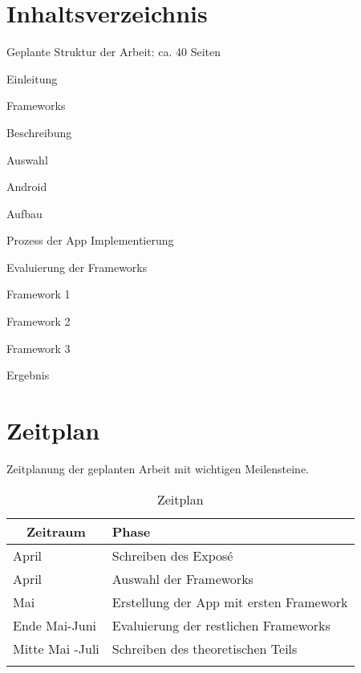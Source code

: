 \documentclass[a4paper,10pt,german,public]{INSOexpose}
\begin{document}
\section{Inhaltsverzeichnis}
Geplante Struktur der Arbeit: ca. 40 Seiten	
\begin{samepage}
  \begin{contentstructure}
    \item Einleitung	
    \item Frameworks 
    \begin{contentstructure}
      \item Beschreibung 
      \item Auswahl 
    \end{contentstructure}
    \item Android 
    \begin{contentstructure}
      \item Aufbau 
      \item Prozess der App Implementierung 
    \end{contentstructure}
    \item Evaluierung der Frameworks 
    \begin{contentstructure}
      \item Framework 1
      \item Framework 2
      \item Framework 3
    \end{contentstructure}
    \item Ergebnis
  \end{contentstructure}
\end{samepage}

\section{Zeitplan}
Zeitplanung der geplanten Arbeit mit wichtigen Meilensteine.

\begin{spacing}{1.4}
\begin{longtable}{|p{.2 \linewidth}|p{.5 \linewidth}|}
	\hline
	\multicolumn{1}{|c|}{\textbf{Zeitraum}} & \textbf{Phase} \\ 
	\hline 
	April & Schreiben des Exposé \\ 
	\hline 
	April & Auswahl der Frameworks \\
	\hline 
	Mai & Erstellung der App mit ersten Framework \\
	\hline 
	Ende Mai-Juni & Evaluierung der restlichen Frameworks \\
	\hline 
	Mitte Mai -Juli & Schreiben des theoretischen Teils \\
	\hline
	\caption{Zeitplan}
	\label{tab:tabZeitplan}
\end{longtable}
\end{spacing}


\nocite{dobjanschi:developing-android}
\nocite{tilko:rest}
\nocite{louis:android}
\nocite{stackOverflow:rest-client}
\nocite{burd:android}
\printbibliography
\end{document}
